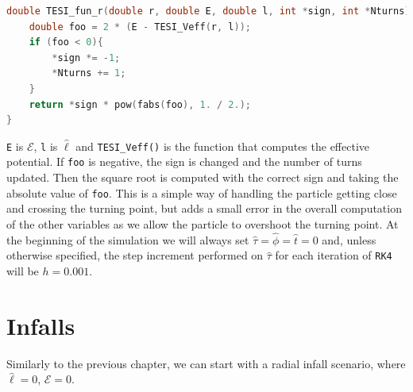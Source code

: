 \begin{lstlisting}[language=C, label=cap2:lst:sign_change, caption=Function to compute the radial derivative]
double TESI_fun_r(double r, double E, double l, int *sign, int *Nturns){
    double foo = 2 * (E - TESI_Veff(r, l));
    if (foo < 0){
        *sign *= -1;
        *Nturns += 1;
    }
    return *sign * pow(fabs(foo), 1. / 2.);
}
\end{lstlisting}

\texttt{E} is $\mathcal E$, \texttt{l} is $\hat \ell$ and \texttt{TESI\_Veff()} is
the function that computes the effective potential.
If \texttt{foo} is negative, the sign is changed and the number of turns
updated.
Then the square root is computed with the correct sign and taking the absolute
value of \texttt{foo}.
This is a simple way of handling the particle getting close and crossing the
turning point, but adds a small error in the overall computation of the other
variables as we allow the particle to overshoot the turning point.
At the beginning of the simulation we will always set
$\hat \tau = \hat \phi = \hat t = 0$ and, unless otherwise specified, the step
increment performed on $\hat \tau$ for each iteration of \texttt{RK4} will be
$h = 0.001$.

\newpage


\section{Infalls}

Similarly to the previous chapter, we can start with a radial infall scenario,
where $\hat \ell = 0$, $\mathcal E = 0$.

